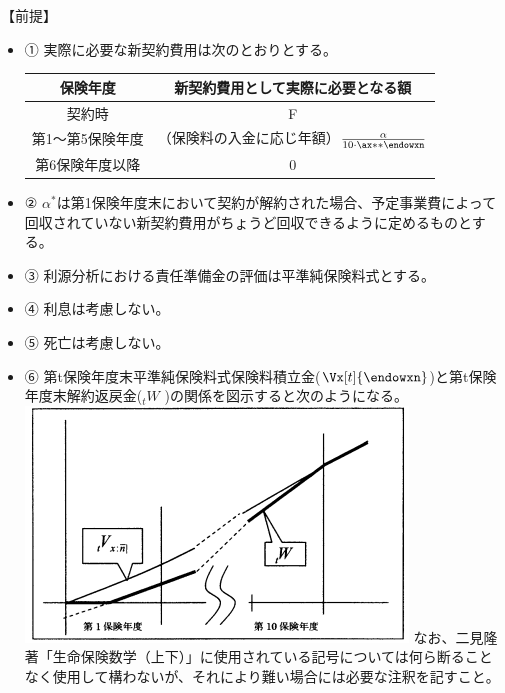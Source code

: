 \documentclass[report,gutter=10mm,fore-edge=10mm,uplatex,dvipdfmx]{jlreq}
\begin{document}
【前提】
\begin{itemize}
 \item ① 実際に必要な新契約費用は次のとおりとする。
\begin{table}[h]
  \begin{tabular}[t]{|c|c|}
 \hline
  保険年度 & 新契約費用として実際に必要となる額\\
 \hline
  契約時& F\\
  第1～第5保険年度& （保険料の入金に応じ年額）$\frac{\alpha}{10\cdot\ax**{\endowxn}}$\\
 第6保険年度以降 & 0\\
 \hline
 \end{tabular}
\end{table} 
\item ② $\alpha^{*}$は第1保険年度末において契約が解約された場合、予定事業費によって回収されていない新契約費用がちょうど回収できるように定めるものとする。
 \item ③ 利源分析における責任準備金の評価は平準純保険料式とする。
 \item ④ 利息は考慮しない。
 \item ⑤ 死亡は考慮しない。
 \item ⑥ 第t保険年度末平準純保険料式保険料積立金($\Vx[t]{\endowxn}$)と第t保険年度末解約返戻金($_tW$ )の関係を図示すると次のようになる。
\includegraphics[scale=0.5]{images/ProbH16-1-2-3.png}
なお、二見隆著「生命保険数学（上下）」に使用されている記号については何ら断ることなく使用して構わないが、それにより難い場合には必要な注釈を記すこと。
\end{itemize}

\end{document}
